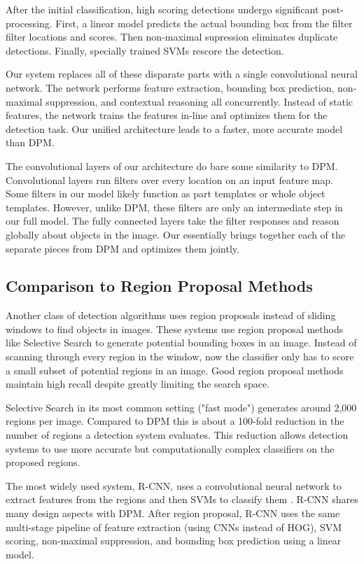 \documentclass{article} %
\begin{document}
After the initial classification, high scoring detections undergo significant post-processing. First, a linear model predicts the actual bounding box from the filter filter locations and scores. Then non-maximal supression eliminates duplicate detections. Finally, specially trained SVMs rescore the detection.

Our system replaces all of these disparate parts with a single convolutional neural network. The network performs feature extraction, bounding box prediction, non-maximal suppression, and contextual reasoning all concurrently. Instead of static features, the network trains the features in-line and optimizes them for the detection task. Our unified architecture leads to a faster, more accurate model than DPM.

The convolutional layers of our architecture do bare some similarity to DPM. Convolutional layers run filters over every location on an input feature map. Some filters in our model likely function as part templates or whole object templates. However, unlike DPM, these filters are only an intermediate step in our full model. The fully connected layers take the filter responses and reason globally about objects in the image. Our essentially brings together each of the separate pieces from DPM and optimizes them jointly.

\subsection{Comparison to Region Proposal Methods}

Another class of detection algorithms uses region proposals instead of sliding windows to find objects in images. These systems use region proposal methods like Selective Search \cite{uijlings2013selective} to generate potential bounding boxes in an image. Instead of scanning through every region in the window, now the classifier only has to score a small subset of potential regions in an image. Good region proposal methods maintain high recall despite greatly limiting the search space.

Selective Search in its most common setting ("fast mode") generates around 2,000 regions per image. Compared to DPM this is about a 100-fold reduction in the number of regions a detection system evaluates. This reduction allows detection systems to use more accurate but computationally complex classifiers on the proposed regions.

The most widely used system, R-CNN, uses a convolutional neural network to extract features from the regions and then SVMs to classify them \cite{girshick2014rich}. R-CNN shares many design aspects with DPM. After region proposal, R-CNN uses the same multi-stage pipeline of feature extraction (using CNNs instead of HOG), SVM scoring, non-maximal suppression, and bounding box prediction using a linear model.
\end{document}
